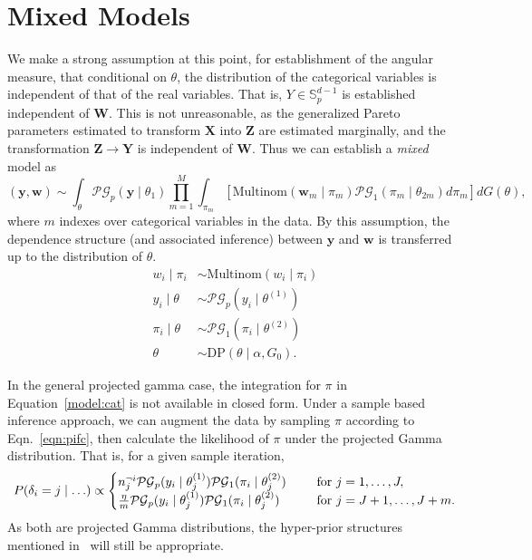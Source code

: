 \section{Mixed Models}
We make a strong assumption at this point, for establishment of the angular 
  measure, that conditional on $\theta$, the distribution of the categorical 
  variables is independent of that of the real variables.  That is, 
  $Y \in {\mathbb S}_{p}^{d-1}$ is established independent of $\bm{W}$.  This is 
  not unreasonable, as the generalized Pareto parameters estimated to transform 
  $\bm{X}$ into $\bm{Z}$ are estimated marginally, and the transformation 
  $\bm{Z}\to\bm{Y}$ is independent of $\bm{W}$.  Thus we can establish a 
  \emph{mixed} model as
  \begin{equation}
    \label{model:mixed}
    (\bm{y},\bm{w})\sim \int_{\theta}\mathcal{PG}_{p}(\bm{y}\mid\theta_1)
      \prod_{m = 1}^M\int_{\pi_m}
      \left[\text{Multinom}(\bm{w}_m\mid\pi_m)
                \mathcal{PG}_1(\pi_m\mid\theta_{2m})d\pi_{m}\right]dG(\theta),
  \end{equation}
  where $m$ indexes over categorical variables in the data. By this assumption, 
  the dependence structure (and associated inference) between $\bm{y}$ and 
  $\bm{w}$ is transferred up to the distribution of $\theta$.
  \begin{equation*}
    \label{model:mixeddp}
    \begin{aligned}
    w_i\mid \pi_i &\sim \text{Multinom}(w_i\mid \pi_i)\\
    y_i\mid\theta &\sim\mathcal{PG}_p(y_i\mid\theta^{(1)})\\
    \pi_i\mid\theta &\sim \mathcal{PG}_1(\pi_i\mid\theta^{(2)})\\
    \theta &\sim \text{DP}(\theta\mid\alpha, G_0).
    \end{aligned}
  \end{equation*}

In the general projected gamma case, the integration for $\pi$ in 
  Equation~\ref{model:cat} is not available in closed form.  Under a sample 
  based inference approach, we can augment the data by sampling $\pi$ according 
  to Eqn.~\ref{eqn:pifc}, then calculate the likelihood of $\pi$ under the 
  projected Gamma distribution.  That is, for a given sample iteration,
  \begin{equation*}
    \begin{aligned}
    P(\delta_i = j\mid \ldots) \propto \begin{cases} 
    n_j^{\neg i}\mathcal{PG}_p(y_i\mid\theta_j^{(1)})
      \mathcal{PG}_1(\pi_i\mid\theta_j^{(2)}) \hspace{0.5cm}&\text{for }j = 1,\ldots,J,\\
    \frac{\eta}{m}\mathcal{PG}_p(y_i\mid\theta_j^{(1)})
      \mathcal{PG}_1(\pi_i\mid\theta_j^{(2)}) \hspace{0.5cm}&\text{for }j = J + 1,\ldots, J + m.\\
    \end{cases}
    \end{aligned}
  \end{equation*}
  As both are projected Gamma distributions, the hyper-prior structures mentioned 
  in~\cite{trubey:pg} will still be appropriate.


